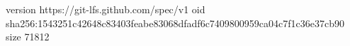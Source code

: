 version https://git-lfs.github.com/spec/v1
oid sha256:1543251c42648c83403feabe83068dfadf6c7409800959ca04c7f1c36e37cb90
size 71812
